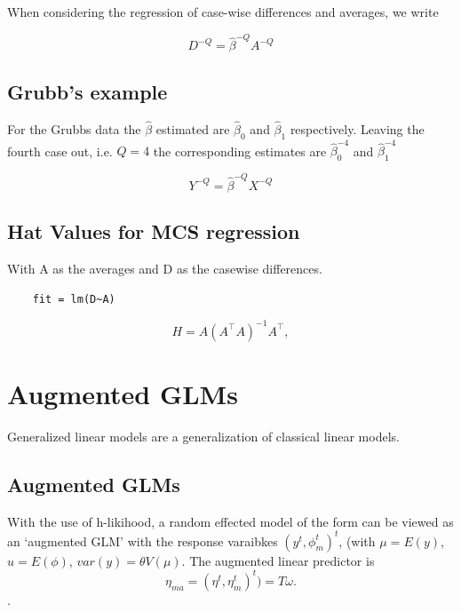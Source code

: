 \documentclass[12pt, a4paper]{report}
\theoremstyle{plain}
\theoremstyle{definition}
\theoremstyle{remark}
\begin{document}
	When considering the regression of case-wise differences and
	averages, we write
	
	\begin{equation}
	D^{-Q} = \hat{\beta}^{-Q}A^{-Q}
	\end{equation}
	
	\section{Grubb's example}
	For the Grubbs data the $\hat{\beta}$ estimated are $\hat{\beta}_{0}$ and $\hat{\beta}_{1}$ respectively. Leaving the
	fourth case out, i.e. $Q=4$ the corresponding estimates are $\hat{\beta}_{0}^{-4}$ and $\hat{\beta}_{1}^{-4}$
	
	\begin{equation}
	Y^{-Q} = \hat{\beta}^{-Q}X^{-Q}
	\end{equation}
	
	
	
	
	\section{Hat Values for MCS regression}
	
	With A as the averages and D as the casewise differences.
	\begin{verbatim}
	fit = lm(D~A)
	\end{verbatim}
	
	\begin{displaymath}
	H = A \left(A^\top  A\right)^{-1} A^\top ,
	\end{displaymath}
	
	\chapter{Augmented GLMs} 
	
	
	
	
	Generalized linear models are a generalization of classical linear  models.
	
	\section{Augmented GLMs} %
	
	With the use of h-likihood, a random effected model of the form can be viewed as an `augmented GLM' with the response varaibkes $(y^t, \phi^t_m)^t$, (with $\mu = E(y)$,$ u = E(\phi)$, $var(y) = \theta V (\mu)$.
	The augmented linear predictor is \[\eta_{ma}  = (\eta^t, \eta^t_m)^t) = T\omega. \].
	
\end{document}
